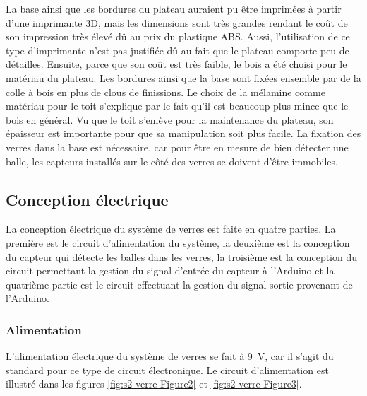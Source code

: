 La base ainsi que les bordures du plateau auraient pu être imprimées à partir d’une imprimante 3D, mais les dimensions sont très grandes rendant le coût de son impression très élevé dû au prix du plastique ABS.
Aussi, l’utilisation de ce type d’imprimante n’est pas justifiée dû au fait que le plateau comporte peu de détailles.
Ensuite, parce que son coût est très faible, le bois a été choisi pour le matériau du plateau.
Les bordures ainsi que la base sont fixées ensemble par de la colle à bois en plus de clous de finissions.
Le choix de la mélamine comme matériau pour le toit s’explique par le fait qu’il est beaucoup plus mince que le bois en général.
Vu que le toit s’enlève pour la maintenance du plateau, son épaisseur est importante pour que sa manipulation soit plus facile.
La fixation des verres dans la base est nécessaire, car pour être en mesure de bien détecter une balle, les capteurs installés sur le côté des verres se doivent d’être immobiles.

\subsection{Conception électrique}

La conception électrique du système de verres est faite en quatre parties.
La première est le circuit d’alimentation du système, la deuxième est la conception du capteur qui détecte les balles dans les verres, la troisième est la conception du circuit permettant la gestion du signal d’entrée du capteur à l'Arduino et la quatrième partie est le circuit effectuant la gestion du signal sortie provenant de l’Arduino.

\subsubsection{Alimentation}

L’alimentation électrique du système de verres se fait à 9~V, car il s’agit du standard pour ce type de circuit électronique.
Le circuit d’alimentation est illustré dans les figures \ref{fig:s2-verre-Figure2} et \ref{fig:s2-verre-Figure3}.

